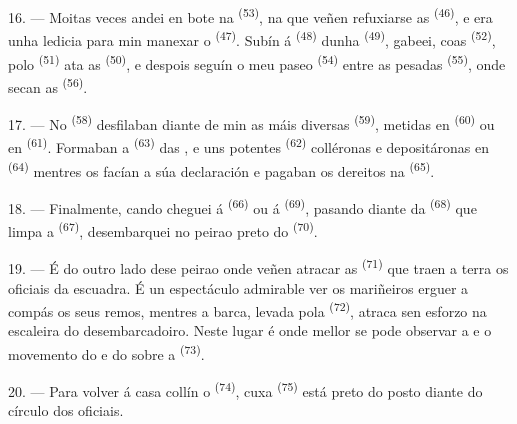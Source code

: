 \VUsaut{3.0mm}
\VUsaut{3.0mm}

16. --- Moitas veces andei en bote na 
\textsuperscript{(53)}, na que veñen refuxiarse as 
\textsuperscript{(46)}, e era unha ledicia para min manexar o 
\textsuperscript{(47)}. Subín á  \textsuperscript{(48)} dunha
 \textsuperscript{(49)}, gabeei, coas 
\textsuperscript{(52)}, polo  \textsuperscript{(51)} ata as
 \textsuperscript{(50)}, e despois seguín o meu paseo 
\textsuperscript{(54)} entre as pesadas 
\textsuperscript{(55)}, onde secan as  \textsuperscript{(56)}.

17. --- No  \textsuperscript{(58)} desfilaban diante de min as máis
diversas  \textsuperscript{(59)}, metidas en 
\textsuperscript{(60)} ou en  \textsuperscript{(61)}. Formaban a
 \textsuperscript{(63)} das , e uns
 potentes \textsuperscript{(62)} colléronas e depositáronas en
 \textsuperscript{(64)} mentres os  facían a
súa declaración e pagaban os dereitos na  \textsuperscript{(65)}.

18. --- Finalmente, cando cheguei á  \textsuperscript{(66)} ou
á  \textsuperscript{(69)}, pasando diante da 
\textsuperscript{(68)} que limpa a  \textsuperscript{(67)}, desembarquei
no peirao preto do  \textsuperscript{(70)}.

19. --- É do outro lado dese peirao onde veñen atracar as 
\textsuperscript{(71)} que traen a terra os oficiais da escuadra. É un espectáculo
admirable ver os mariñeiros erguer a compás os seus remos, mentres a barca, levada pola
 \textsuperscript{(72)}, atraca sen esforzo na escaleira do
desembarcadoiro. Neste lugar é onde mellor se pode observar a  e o
movemento do  e do  sobre a 
\textsuperscript{(73)}.

\VUsaut{3.0mm}
\VUsaut{3.0mm}

20. --- Para volver á casa collín o 
\textsuperscript{(74)}, cuxa  \textsuperscript{(75)} está preto do
 posto diante do círculo dos oficiais.

